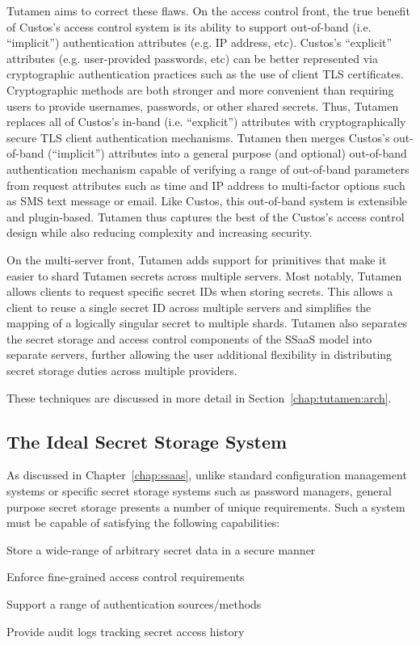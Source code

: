 Tutamen aims to correct these flaws. On the access control front, the
true benefit of Custos's access control system is its ability to
support out-of-band (i.e. ``implicit'') authentication attributes
(e.g. IP address, etc). Custos's ``explicit'' attributes
(e.g. user-provided passwords, etc) can be better represented via
cryptographic authentication practices such as the use of client TLS
certificates. Cryptographic methods are both stronger and more
convenient than requiring users to provide usernames, passwords, or
other shared secrets. Thus, Tutamen replaces all of Custos's in-band
(i.e. ``explicit'') attributes with cryptographically secure TLS
client authentication mechanisms. Tutamen then merges Custos's
out-of-band (``implicit'') attributes into a general purpose (and
optional) out-of-band authentication mechanism capable of verifying a
range of out-of-band parameters from request attributes such as time
and IP address to multi-factor options such as SMS text message or
email. Like Custos, this out-of-band system is extensible and
plugin-based. Tutamen thus captures the best of the Custos's access
control design while also reducing complexity and increasing security.

On the multi-server front, Tutamen adds support for primitives that
make it easier to shard Tutamen secrets across multiple servers. Most
notably, Tutamen allows clients to request specific secret IDs when
storing secrets. This allows a client to reuse a single secret ID
across multiple servers and simplifies the mapping of a logically
singular secret to multiple shards. Tutamen also separates the secret
storage and access control components of the SSaaS model into separate
servers, further allowing the user additional flexibility in
distributing secret storage duties across multiple providers.

These techniques are discussed in more detail in
Section~\ref{chap:tutamen:arch}.

\subsection{The Ideal Secret Storage System}

As discussed in Chapter~\ref{chap:ssaas}, unlike standard
configuration management systems or specific secret storage systems
such as password managers, general purpose secret storage presents a
number of unique requirements. Such a system must be capable of
satisfying the following capabilities:

\begin{packed_item}
\item Store a wide-range of arbitrary secret data in a secure manner
\item Enforce fine-grained access control requirements
\item Support a range of authentication sources/methods
\item Provide audit logs tracking secret access history
\end{packed_item}

